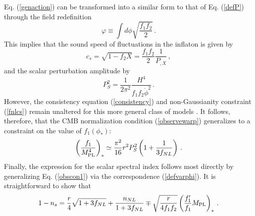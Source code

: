 Eq. (\ref{genaction}) 
can be transformed into a similar form to that of 
Eq. (\ref{defP}) through the field redefinition 
\begin{equation}
\label{defvarphi}
\varphi \equiv \int d \phi \sqrt{\frac{f_1f_2}{2}}  \,.
\end{equation}
This implies that the sound speed of fluctuations in 
the inflaton is given by 
\begin{equation}
\label{generalspeed}
c_s = \sqrt{1-f_2 X} = \frac{f_1f_2}{2} \frac{1}{P_{,X}}  \,,
\end{equation}
and the scalar perturbation amplitude by 
\begin{equation}
\label{genamp}
P_S^2 = \frac{1}{2\pi^2}\frac{H^4}{f_1f_2\dot{\phi}^2}  \,.
\end{equation}
However, the consistency equation (\ref{consistency}) and 
non-Gaussianity constraint (\ref{fnlcs}) remain unaltered 
for this more general class 
of models \cite{lidser2}. It 
follows, therefore, 
that the CMB normalization condition (\ref{observewarp}) 
generalizes to a constraint on the value of $f_1 (\phi_*)$:  
\begin{equation}
\label{observef1}
\left( \frac{f_1}{M_{\mathrm{PL}}^4} \right)_{*} \simeq \frac{\pi^2}{16} r^2P_S^2
\left( 1+ \frac{1}{3f_{NL}} \right)  \,.
\end{equation}
Finally, the expression for the scalar spectral index
follows most directly by generalizing Eq. (\ref{obscon1}) 
via the correspondence (\ref{defvarphi}). It  
is straightforward to show that 
\begin{equation}
\label{constraintW}
1-n_s = \frac{r}{4} \sqrt{1+3f_{NL}}
 +\frac{n_{NL}}{1+3f_{NL} } \mp \sqrt{\frac{r}{4f_1f_2}} \left( 
\frac{f_1'}{f_1} M_{\mathrm{PL}} \right)_*  \,.
\end{equation}

